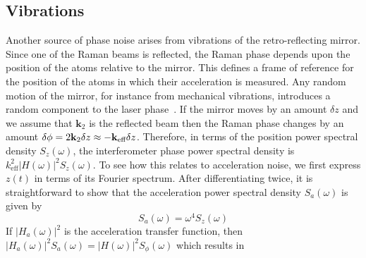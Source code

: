\subsection{Vibrations}\label{subsec:vibration_noise}
Another source of phase noise arises from vibrations of the
retro-reflecting mirror. Since one of the Raman beams is reflected, the Raman phase depends upon the position of the atoms relative
to the mirror. This defines a frame of
reference for the position of the atoms in which their acceleration is
measured. Any
random motion of the mirror, for instance from mechanical vibrations,
introduces a random component to the laser phase~\cite{Vigue2006}. If
the mirror moves by an amount $\delta z$ and we assume that
$\textbf{k}_2$ is the reflected beam then the Raman phase changes by
an amount $\delta \phi = 2 \textbf{k}_2 \delta z \approx - {\textbf k_\textnormal{eff}} \delta
z$. Therefore, in terms of the position power spectral density $S_z
(\omega)$, the interferometer phase power spectral density is
$k_\text{eff}^2 |H(\omega)|^2 S_z(\omega)$. To see how this relates to
acceleration noise, we first express $z(t)$ in terms of its Fourier
spectrum. After differentiating twice, it is straightforward to show
that the acceleration power spectral density $S_a(\omega)$ is given by
\begin{equation}
  S_a(\omega) = \omega^4 S_z(\omega) 
\end{equation}
If $|H_a(\omega)|^2$ is the acceleration transfer function, then
$|H_a(\omega)|^2 S_a(\omega) = |H(\omega)|^2 S_\phi(\omega)$ which
results in
